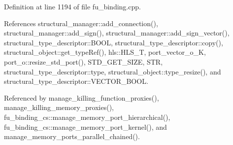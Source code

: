 Definition at line 1194 of file fu\+\_\+binding.\+cpp.



References structural\+\_\+manager\+::add\+\_\+connection(), structural\+\_\+manager\+::add\+\_\+sign(), structural\+\_\+manager\+::add\+\_\+sign\+\_\+vector(), structural\+\_\+type\+\_\+descriptor\+::\+B\+O\+OL, structural\+\_\+type\+\_\+descriptor\+::copy(), structural\+\_\+object\+::get\+\_\+type\+Ref(), hls\+::\+H\+L\+S\+\_\+T, port\+\_\+vector\+\_\+o\+\_\+K, port\+\_\+o\+::resize\+\_\+std\+\_\+port(), S\+T\+D\+\_\+\+G\+E\+T\+\_\+\+S\+I\+ZE, S\+TR, structural\+\_\+type\+\_\+descriptor\+::type, structural\+\_\+object\+::type\+\_\+resize(), and structural\+\_\+type\+\_\+descriptor\+::\+V\+E\+C\+T\+O\+R\+\_\+\+B\+O\+OL.



Referenced by manage\+\_\+killing\+\_\+function\+\_\+proxies(), manage\+\_\+killing\+\_\+memory\+\_\+proxies(), fu\+\_\+binding\+\_\+cs\+::manage\+\_\+memory\+\_\+port\+\_\+hierarchical(), fu\+\_\+binding\+\_\+cs\+::manage\+\_\+memory\+\_\+port\+\_\+kernel(), and manage\+\_\+memory\+\_\+ports\+\_\+parallel\+\_\+chained().

